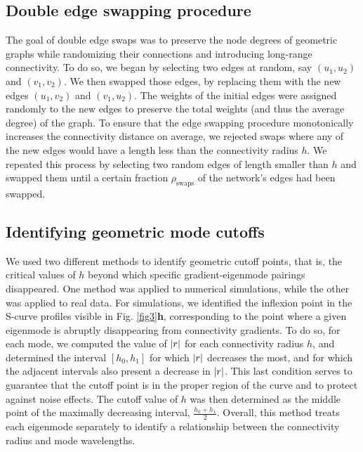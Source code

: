 \documentclass{article}
\begin{document}
\subsection*{Double edge swapping procedure}

The goal of double edge swaps was to preserve the node degrees of geometric graphs while randomizing their connections and introducing long-range connectivity. To do so, we began by selecting two edges at random, say $(u_1, u_2)$ and $(v_1, v_2)$. We then swapped those edges, by replacing them with the new edges $(u_1, v_2)$ and $(v_1, u_2)$. The weights of the initial edges were assigned randomly to the new edges to preserve the total weights (and thus the average degree) of the graph. To ensure that the edge swapping procedure monotonically increases the connectivity distance on average, we rejected swaps where any of the new edges would have a length less than the connectivity radius $h$. We repeated this process by selecting two random edges of length smaller than $h$ and swapped them until a certain fraction $\rho_\text{swaps}$ of the network's edges had been swapped.

\subsection*{Identifying geometric mode cutoffs}

We used two different methods to identify geometric cutoff points, that is, the critical values of $h$ beyond which specific gradient-eigenmode pairings disappeared. One method was applied to numerical simulations, while the other was applied to real data. For simulations, we identified the inflexion point in the S-curve profiles visible in Fig. \ref{fig3}\textbf{h}, corresponding to the point where a given eigenmode is abruptly disappearing from connectivity gradients. To do so, for each mode, we computed the value of $\abs{r}$ for each connectivity radius $h$, and determined the interval $[h_0, h_1]$ for which $\abs{r}$ decreases the most, and for which the adjacent intervals also present a decrease in $\abs{r}$. This last condition serves to guarantee that the cutoff point is in the proper region of the curve and to protect against noise effects. The cutoff value of $h$ was then determined as the middle point of the maximally decreasing interval, $\frac{h_0 + h_1}{2}$. Overall, this method treats each eigenmode separately to identify a relationship between the connectivity radius and mode wavelengths.
\end{document}
